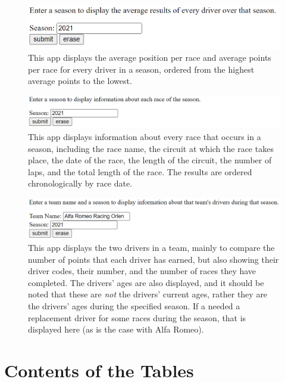 \documentclass{article} %
\begin{document}
\begin{figure}[H]
    \centering
    \includegraphics[scale=0.35]{6.PNG}
    \caption{This app displays the average position per race and average
    points per race for every driver in a season, ordered from the highest
    average points to the lowest.}
\end{figure}
\begin{figure}[H]
    \centering
    \includegraphics[scale=0.35]{7.PNG}
    \caption{This app displays information about every race that occurs
    in a season, including the race name, the circuit at which the race
    takes place, the date of the race, the length of the circuit, the
    number of laps, and the total length of the race. The results are
    ordered chronologically by race date.}
\end{figure}
\begin{figure}[H]
    \centering
    \includegraphics[scale=0.35]{8.PNG}
    \caption{This app displays the two drivers in a team, mainly to
    compare the number of points that each driver has earned, but also
    showing their driver codes, their number, and the number of races
    they have completed. The drivers' ages are also displayed, and it
    should be noted that these are \textit{not} the drivers' current ages,
    rather they are the drivers' ages during the specified season. If a
    needed a replacement driver for some races during the season, that
    is displayed here (as is the case with Alfa Romeo).}
\end{figure}


\section{Contents of the Tables}
\end{document}

